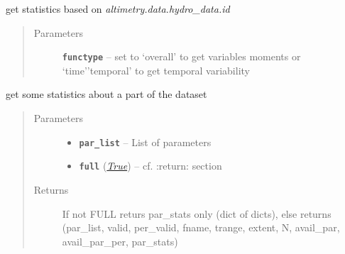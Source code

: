 \documentclass[letterpaper,10pt,english]{sphinxmanual}
\begin{document}
\begin{fulllineitems}
\begin{fulllineitems}
\begin{quote}
\begin{description}
\end{description}\end{quote}

\end{fulllineitems}


\begin{fulllineitems}
\label{altimetry.data:altimetry.data.hydro_data.get_platform_stats}
get statistics based on \emph{altimetry.data.hydro\_data.id}
\begin{quote}\begin{description}
\item[{Parameters}] \leavevmode
\textbf{\texttt{functype}} -- set to `overall' to get variables moments or `time'\textbar{}'temporal' to get temporal variability

\end{description}\end{quote}

\end{fulllineitems}


\begin{fulllineitems}
\label{altimetry.data:altimetry.data.hydro_data.get_stats}
get some statistics about a part of the dataset
\begin{quote}\begin{description}
\item[{Parameters}] \leavevmode\begin{itemize}
\item {} 
\textbf{\texttt{par\_list}} -- List of parameters

\item {} 
\textbf{\texttt{full}} (\href{http://docs.python.org/library/constants.html\#True}{\emph{True}}) -- cf. :return: section

\end{itemize}

\item[{Returns}] \leavevmode
If not FULL returs par\_stats only (dict of dicts), else returns (par\_list, valid, per\_valid, fname, trange, extent, N, avail\_par, avail\_par\_per, par\_stats)


\end{description}
\end{quote}
\end{fulllineitems}
\end{fulllineitems}
\end{document}
